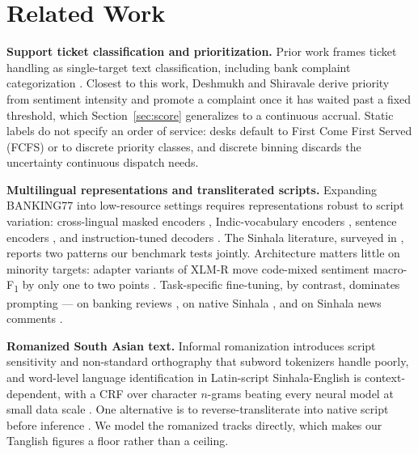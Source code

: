 \section{Related Work}
\label{sec:related}

\textbf{Support ticket classification and prioritization.}
Prior work frames ticket handling as single-target text classification,
including bank complaint categorization \cite{arya2026bank}. Closest to this
work, Deshmukh and Shiravale \cite{deshmukh2020priority} derive priority from
sentiment intensity and promote a complaint once it has waited past a fixed
threshold, which Section~\ref{sec:score} generalizes to a continuous accrual.
Static labels do not specify an order of service: desks default to First Come
First Served (FCFS) or to discrete priority classes, and discrete binning
discards the uncertainty continuous dispatch needs.

\textbf{Multilingual representations and transliterated scripts.}
Expanding BANKING77 \cite{casanueva2020banking77} into low-resource settings
requires representations robust to script variation: cross-lingual masked
encoders \cite{conneau2020xlmr,marone2025mmbert}, Indic-vocabulary encoders
\cite{khanuja2021muril}, sentence encoders \cite{feng2022labse}, and
instruction-tuned decoders \cite{gemmateam2025gemma3}. The Sinhala literature,
surveyed in \cite{desilva2019sinhalasurvey}, reports two patterns our benchmark
tests jointly. Architecture matters little on minority targets: adapter variants
of XLM-R move code-mixed sentiment macro-F\textsubscript{1} by only one to two
points \cite{rathnayake2022adapter}. Task-specific fine-tuning, by contrast,
dominates prompting --- on banking reviews \cite{senevirathna2025multilingual},
on native Sinhala \cite{aravinda2025sinllama}, and on Sinhala news comments
\cite{bandaranayake2025sinhala}.

\textbf{Romanized South Asian text.}
Informal romanization introduces script sensitivity and non-standard orthography
\cite{rajapakse2026script,sumanathilaka2022romanized}
that subword tokenizers handle poorly, and word-level language identification in
Latin-script Sinhala-English is context-dependent, with a CRF over character
$n$-grams beating every neural model at small data scale
\cite{smith2020codemixed}. One alternative is to reverse-transliterate into
native script before inference \cite{perera2025indonlp,sumanathilaka2026swabhasha}.
We model the romanized tracks directly, which makes our Tanglish figures a floor
rather than a ceiling.

